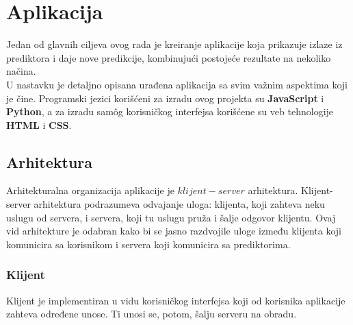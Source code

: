 \chapter{Aplikacija}
Jedan od glavnih ciljeva ovog rada je kreiranje aplikacije koja prikazuje izlaze iz prediktora i daje nove predikcije, kombinujući postojeće rezultate na nekoliko načina. \\

U nastavku je detaljno opisana urađena aplikacija sa svim važnim aspektima koji je čine. Programski jezici korišćeni za izradu ovog projekta su \textbf{JavaScript} i \textbf{Python}, a za izradu samôg korisničkog interfejsa korišćene su veb tehnologije \textbf{HTML} i \textbf{CSS}.
\section{Arhitektura}
Arhitekturalna organizacija aplikacije je $klijent-server$ arhitektura. Klijent-server arhitektura podrazumeva odvajanje uloga: klijenta, koji zahteva neku uslugu od servera, i servera, koji tu uslugu pruža i šalje odgovor klijentu. Ovaj vid arhitekture je odabran kako bi se jasno razdvojile uloge između klijenta koji komunicira sa korisnikom i servera koji komunicira sa prediktorima.

\subsection{Klijent} 
Klijent je implementiran u vidu korisničkog interfejsa koji od korisnika aplikacije zahteva određene unose. Ti unosi se, potom, šalju serveru na obradu.\\

